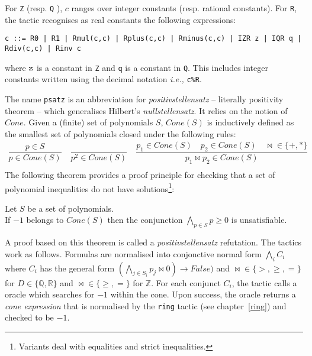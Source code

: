 For {\tt Z} (resp. {\tt Q} ), $c$ ranges over integer constants (resp. rational constants).
For {\tt R}, the tactic recognises as real constants the following expressions:
\begin{verbatim}
c ::= R0 | R1 | Rmul(c,c) | Rplus(c,c) | Rminus(c,c) | IZR z | IQR q | Rdiv(c,c) | Rinv c
\end{verbatim}
where ${\tt z}$ is a constant in {\tt Z} and {\tt q} is a constant in {\tt Q}.
This includes integer constants written using the decimal notation \emph{i.e.,} {\tt c\%R}.

\label{sec:psatz-back}

The name {\tt psatz} is an abbreviation for \emph{positivstellensatz} -- literally positivity theorem -- which
generalises Hilbert's \emph{nullstellensatz}.
%
It relies on the notion of $\mathit{Cone}$. Given  a (finite) set of polynomials $S$, $Cone(S)$ is
inductively defined as the smallest set of polynomials closed under the following rules:
\[
\begin{array}{l}
\dfrac{p \in S}{p \in Cone(S)} \quad 
\dfrac{}{p^2 \in Cone(S)} \quad
\dfrac{p_1 \in Cone(S) \quad p_2 \in Cone(S) \quad \Join \in \{+,*\}} {p_1 \Join p_2 \in Cone(S)}\\
\end{array}
\]
The following theorem provides a proof principle for checking that a set of polynomial inequalities do not have solutions\footnote{Variants deal with equalities and strict inequalities.}:
\begin{theorem}
  \label{thm:psatz}
  Let $S$ be a set of polynomials.\\
  If ${-}1$ belongs to $Cone(S)$ then the conjunction $\bigwedge_{p \in S} p\ge 0$ is unsatisfiable.
\end{theorem}
A proof based on this theorem is called a \emph{positivstellensatz} refutation.
%
The tactics work as follows. Formulas are normalised into conjonctive normal form $\bigwedge_i C_i$ where
$C_i$ has the general form $(\bigwedge_{j\in S_i} p_j \Join 0) \to \mathit{False})$ and $\Join \in \{>,\ge,=\}$ for $D\in
\{\mathbb{Q},\mathbb{R}\}$ and $\Join \in \{\ge, =\}$ for $\mathbb{Z}$.
%
For each conjunct $C_i$, the tactic calls a oracle which searches for $-1$ within the cone.
%
Upon success, the oracle returns a \emph{cone expression} that is normalised by the {\tt ring} tactic (see chapter~\ref{ring}) and checked to be
$-1$.


